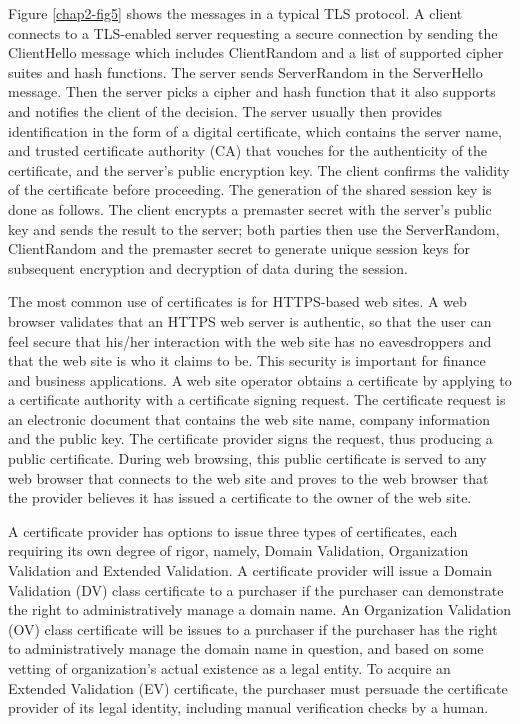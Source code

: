\begin{multicols}{2}
Figure \ref{chap2-fig5} shows the messages in a typical TLS protocol. A client connects to a TLS-enabled server requesting a secure connection by sending the ClientHello message which includes ClientRandom and a list of supported cipher suites and hash functions. The server sends ServerRandom in the ServerHello message. Then the server picks a cipher and hash function that it also supports and notifies the client of the decision. The server usually then provides identification in the form of a digital certificate, which contains the server name, and trusted certificate authority (CA) that vouches for the authenticity of the certificate, and the server's public encryption key. The client confirms the validity of the certificate before proceeding. The generation of the shared session key is done as follows. The client encrypts a premaster secret with the server's public key and sends the result to the server; both parties then use the ServerRandom, ClientRandom and the premaster secret to generate unique session keys for subsequent encryption and decryption of data during the session.

The most common use of certificates is for HTTPS-based web sites. A web browser validates that an HTTPS web server is authentic, so that the user can feel secure that his/her interaction with the web site has no eavesdroppers and that the web site is who it claims to be. This security is important for finance and business applications. A web site operator obtains a certificate by applying to a certificate authority with a certificate signing request. The certificate request is an electronic document that contains the web site name, company information and the public key. The certificate provider signs the request, thus producing a public certificate. During web browsing, this public certificate is served to any web browser that connects to the web site and proves to the web browser that the provider believes it has issued a certificate to the owner of the web site.

A certificate provider has options to issue three types of certificates, each requiring its own degree of rigor, namely, Domain Validation, Organization Validation and Extended Validation. A certificate provider will issue a Domain Validation (DV) class certificate to a purchaser if the purchaser can demonstrate the right to administratively manage a domain name. An Organization Validation (OV) class certificate will be issues to a purchaser if the purchaser has the right to administratively manage the domain name in question, and based on some vetting of organization's actual existence as a legal entity. To acquire an Extended Validation (EV) certificate, the purchaser must persuade the certificate provider of its legal identity, including manual verification checks by a human.


\end{multicols}

